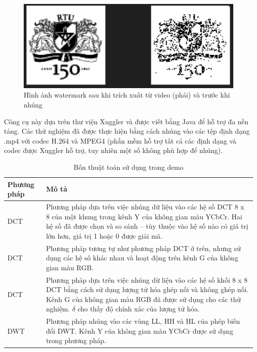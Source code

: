 \begin{figure}
    \centering
    \includegraphics[scale=0.4]{graphics/chapter-3/chap3-result-water-mark.png}
    \caption{Hình ảnh watermark sau khi trích xuất từ video (phải) và trước khi nhúng}
    \label{fig:chap3-result-water-mark}
\end{figure}

Công cụ này dựa trên thư viện Xuggler và được viết bằng Java để hỗ trợ đa nền tảng. Các thử nghiệm đã được thực hiện bằng cách nhúng vào các tệp định dạng .mp4 với codec H.264 và MPEG4 (phần mềm hỗ trợ tất cả các định dạng và codec được Xuggler hỗ trợ, tuy nhiên một số không phù hợp để nhúng).

\begin{table}[ht]
    \centering
    \caption{Bốn thuật toán sử dụng trong demo}
    \label{tab:demo2_algo}
    \begin{tabular}{| p{} | p{} |}
        \hline
        \textbf{Phương pháp} & \textbf{Mô tả}  \\
        \hline
        DCT \cite{algo1_kaur2011steganographic} & Phương pháp dựa trên việc nhúng dữ liệu vào các hệ số DCT 8 x 8 của một khung trong kênh Y của không gian màu YCbCr. Hai hệ số đã được chọn và so sánh – tùy thuộc vào hệ số nào có giá trị lớn hơn, giá trị 1 hoặc 0 được giải   mã. \\
        \hline
        DCT \cite{algo2_kothari2011performance} & Phương pháp tương tự như phương pháp DCT ở trên, nhưng sử dụng các hệ số khác nhau và hoạt động trên kênh G của không gian màu RGB. \\
        \hline
        DCT \cite{algo3_al2012robust} & Phương pháp dựa trên việc nhúng dữ liệu vào các hệ số khối 8 x 8 DCT bằng  cách sử dụng lượng tử hóa ghép nối và không ghép nối. Kênh G của không gian  màu RGB đã được sử dụng cho các thử nghiệm. $\delta$ cho thấy độ chính xác của lượng tử hóa. \\ 
        \hline
        DWT \cite{algo4_chetan2010dwt} & Phương pháp nhúng vào các vùng LL, HH và HL của phép biến đổi DWT. Kênh Y của không gian màu YCbCr được sử dụng trong phương pháp. \\
        \hline
    \end{tabular}
\end{table}

